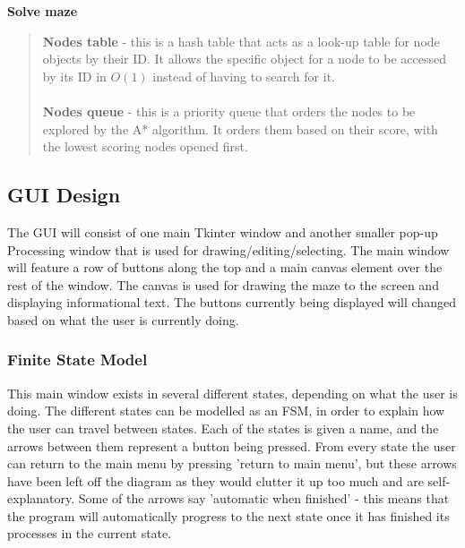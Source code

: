 \documentclass[titlepage]{article}
\begin{document}
\textbf{Solve maze}
\begin{quote}
\textbf{Nodes table} - this is a hash table that acts as a look-up table for node objects by their ID. It allows the specific object for a node to be accessed by its ID in $O(1)$ instead of having to search for it.
\\\\
\textbf{Nodes queue} - this is a priority queue that orders the nodes to be explored by the A* algorithm. It orders them based on their score, with the lowest scoring nodes opened first. 
\end{quote}


\subsection{GUI Design}
The GUI will consist of one main Tkinter window and another smaller pop-up Processing window that is used for drawing/editing/selecting. The main window will feature a row of buttons along the top and a main canvas element over the rest of the window. The canvas is used for drawing the maze to the screen and displaying informational text. The buttons currently being displayed will changed based on what the user is currently doing.

\subsubsection{Finite State Model}
This main window exists in several different states, depending on what the user is doing. The different states can be modelled as an FSM, in order to explain how the user can travel between states. Each of the states is given a name, and the arrows between them represent a button being pressed. From every state the user can return to the main menu by pressing 'return to main menu', but these arrows have been left off the diagram as they would clutter it up too much and are self-explanatory. Some of the arrows say 'automatic when finished' - this means that the program will automatically progress to the next state once it has finished its processes in the current state.
\end{document}
